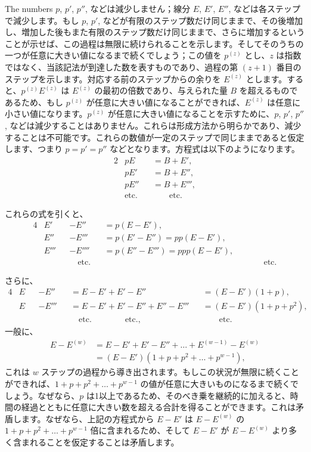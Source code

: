 \documentclass[a4paper,11pt,openany]{ltjsbook}
\newcommand{\etc}{\text{etc}}
\begin{document}
The numbers \( p \), \( p' \), \( p'' \), などは減少しません；線分 \( E \), \( E' \), \( E'' \), などは各ステップで減少します。もし \( p \), \( p' \), などが有限のステップ数だけ同じままで、その後増加し、増加した後もまた有限のステップ数だけ同じままで、さらに増加するということが示せば、この過程は無限に続けられることを示します。そしてそのうちの一つが任意に大きい値になるまで続くでしょう；この値を \( p^{(z)} \) とし、\( z \) は指数ではなく、当該記法が到達した数を表すものであり、過程の第 \( (z + 1) \) 番目のステップを示します。対応する前のステップからの余りを \( E^{(z)} \) とします。すると、\( p^{(z)}E^{(z)} \) は \( E^{(z)} \) の最初の倍数であり、与えられた量 \( B \) を超えるものであるため、もし \( p^{(z)} \) が任意に大きい値になることができれば、\( E^{(z)} \) は任意に小さい値になります。\( p^{(z)} \) が任意に大きい値になることを示すために、\( p \), \( p' \), \( p'' \), などは減少することはありません。これらは形成方法から明らかであり、減少することは不可能です。これらの数値が一定のステップで同じままであると仮定します、つまり \( p = p' = p'' \) などとなります。方程式は以下のようになります。
\begin{alignat*}{2}
&pE   &&= B + E', \\
&pE'  &&= B + E'', \\
&pE'' &&= B + E''', \\
&\etc. && \qquad \etc.
\end{alignat*}

これらの式を引くと、
\begin{alignat*}{4}
&E'   &&- E''   &&= p(E - E'), \\
&E''  &&- E'''  &&= p(E' - E'') = pp(E - E'), \\
&E''' &&- E'''' &&= p(E'' - E''') = ppp(E - E'), \\
&&&\quad \etc. &&&&\qquad \etc.
\end{alignat*}

さらに、
{\small
\begin{alignat*}{4}
&E   &&- E''  &&= E - E' + E' - E''  &&= (E - E')(1 + p), \\
&E   &&- E''' &&= E - E' + E' - E'' + E'' - E''' &&= (E - E')(1 + p + p^2), \\
&    &&      &&\quad \etc. \qquad\qquad \etc., &&\qquad \etc.
\end{alignat*}}
一般に、
\begin{align*}
E - E^{(w)} &= E - E' + E' - E'' + \dots + E^{(w-1)} - E^{(w)} \\
  &= (E - E')(1 + p + p^2 + \dots + p^{w-1}),
\end{align*}
これは \( w \) ステップの過程から導き出されます。もしこの状況が無限に続くことができれば、\( 1 + p + p^2 + \dots + p^{w-1} \) の値が任意に大きいものになるまで続くでしょう。なぜなら、\( p \) は1以上であるため、そのべき乗を継続的に加えると、時間の経過とともに任意に大きい数を超える合計を得ることができます。これは矛盾します。なぜなら、上記の方程式から \( E - E' \) は \( E - E^{(w)} \) の \( 1 + p + p^2 + \dots + p^{w-1} \) 倍に含まれるため、そして \( E - E' \) が \( E - E^{(w)} \) より多く含まれることを仮定することは矛盾します。
\end{document}
